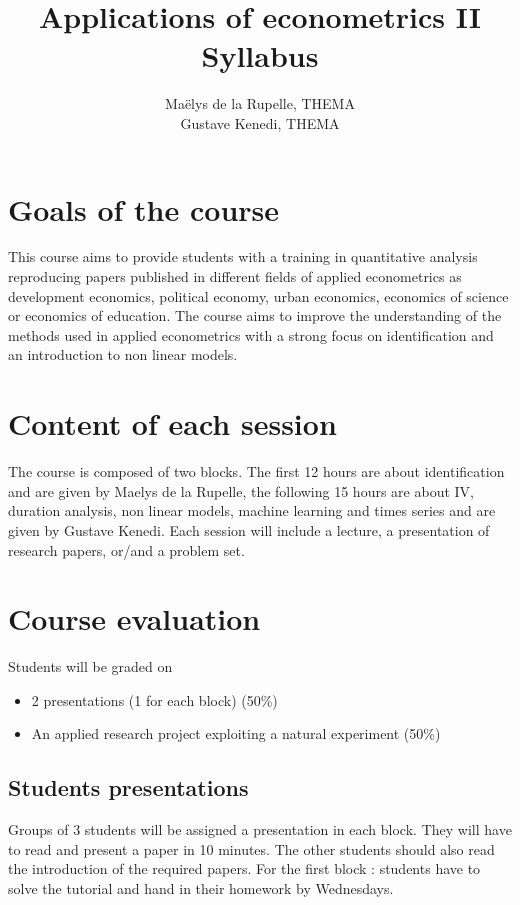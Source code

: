 \documentclass[a4paper,french,11pt]{article}
\title{Applications of econometrics II\\Syllabus}
\author{ Maëlys de la Rupelle, THEMA\\ Gustave Kenedi, THEMA }
\date{}
\begin{document}


\maketitle

\section{Goals of the course}
This course aims to provide students with a training in quantitative analysis reproducing papers published in different fields of applied econometrics as development economics, political economy, urban economics, economics of science or economics of education. The course aims to improve the understanding of the methods used in applied econometrics with a strong focus on identification and an introduction to non linear models.  

\section{Content of each session}
The course is composed of two blocks. The first 12 hours are about identification and are given by Maelys de la Rupelle, the following 15 hours are about IV, duration analysis, non linear models, machine learning and times series and are given by Gustave Kenedi. Each session will include a lecture, a presentation of research papers, or/and a problem set. 

\section{Course evaluation}
Students will be graded on 
\begin{itemize}
  \item 2 presentations (1 for each block) (50\%) 
  \item An applied research project exploiting a natural experiment (50\%) 
\end{itemize}
\subsection*{Students presentations}
Groups of 3 students will be assigned a presentation in each block. They will have to read and present a paper in 10 minutes. 
The other students should also read the introduction of the required papers. 
For the first block : students have to solve the tutorial and hand in their homework by Wednesdays. 
\end{document}
